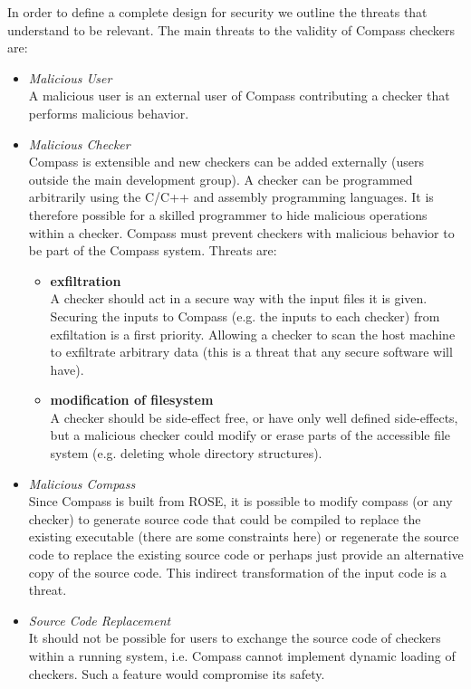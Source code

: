 In order to define a complete design for security we outline the threats that
understand to be relevant. The main threats to the validity of Compass checkers are:
\begin{itemize}
\item \emph{Malicious User} \\ 
  A malicious user is an external user of Compass contributing a checker that performs malicious behavior.
\item \emph{Malicious Checker} \\ 
  Compass is extensible and new checkers can be added externally (users outside the main development group).
  A checker can be programmed arbitrarily using the C/C++ and assembly programming languages. 
  It is therefore possible for a skilled programmer to hide malicious operations within a
  checker.  Compass must prevent checkers with malicious behavior to be part of the
  Compass system. Threats are:
   \begin{itemize}
      \item {\bf exfiltration} \\
         A checker should act in a secure way with the input files it is given.
         Securing the inputs to Compass (e.g. the inputs to each checker) from 
         exfiltation is a first priority. Allowing a checker to scan the host 
         machine to exfiltrate arbitrary data (this is a threat that any secure
         software will have).
      \item {\bf modification of filesystem} \\
         A checker should be side-effect free, or have only well defined side-effects, 
         but a malicious checker could modify or erase parts of the accessible file 
         system (e.g. deleting whole directory structures).
   \end{itemize}

\item \emph{Malicious Compass} \\
    Since Compass is built from ROSE, it is possible to modify compass (or any checker) 
    to generate source code that could be compiled to replace the existing executable
    (there are some constraints here) or regenerate the source code to replace the 
    existing source code or perhaps just provide an alternative copy of the source code.
    This indirect transformation of the input code is a threat.

\item \emph{Source Code Replacement} \\ It should not be possible for users to exchange the
    source code of checkers within a running system, i.e. Compass cannot implement dynamic
    loading of checkers. Such a feature would compromise its safety.


\end{itemize}
